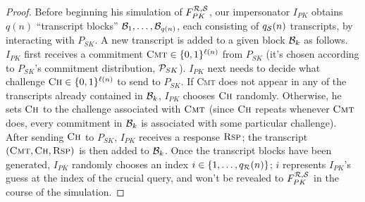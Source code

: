 \begin{proof}
Before beginning his simulation of $F^{\mathcal{R},\mathcal{S}}_{PK}$, our impersonator
$I_{PK}$ obtains $q(n)$ ``transcript blocks'' $\mathcal{B}_1,\ldots,\mathcal{B}_{q(n)}$,
each consisting of $q_{\mathcal{S}}(n)$ transcripts, by interacting with $P_{SK}$. 
A new transcript is added to a given block $\mathcal{B}_k$ as follows.  $I_{PK}$
first receives a commitment $\textsc{Cmt} \in \{0,1\}^{\ell(n)}$ from $P_{SK}$
(it's chosen according to $P_{SK}$'s commitment distribution, $\mathcal{P}_{SK}$).
$I_{PK}$ next needs to decide what challenge $\textsc{Ch} \in \{0,1\}^{\ell(n)}$
to send to $P_{SK}$.
If \textsc{Cmt} does not appear in any of the transcripts already contained in
$\mathcal{B}_k$, $I_{PK}$ chooses $\textsc{Ch}$ randomly. Otherwise, he sets
$\textsc{Ch}$ to the challenge associated with $\textsc{Cmt}$ (since
$\textsc{Ch}$ repeats whenever $\textsc{Cmt}$ does, every commitment in
$\mathcal{B}_k$ is associated with some particular challenge).  After sending
$\textsc{Ch}$ to $P_{SK}$, $I_{PK}$ receives a response $\textsc{Rsp}$;
the transcript $(\textsc{Cmt},\textsc{Ch},\textsc{Rsp})$ is then added to
$\mathcal{B}_k$.  Once the transcript blocks have been generated, $I_{PK}$ 
randomly chooses an index 
$i \in \{1,\ldots,q_{\mathcal{R}}(n)\}$; $i$ represents $I_{PK}$'s guess at the index
of the crucial query, and won't be revealed to $F^{\mathcal{R},\mathcal{S}}_{PK}$ in the
course of the simulation. 


\end{proof}
